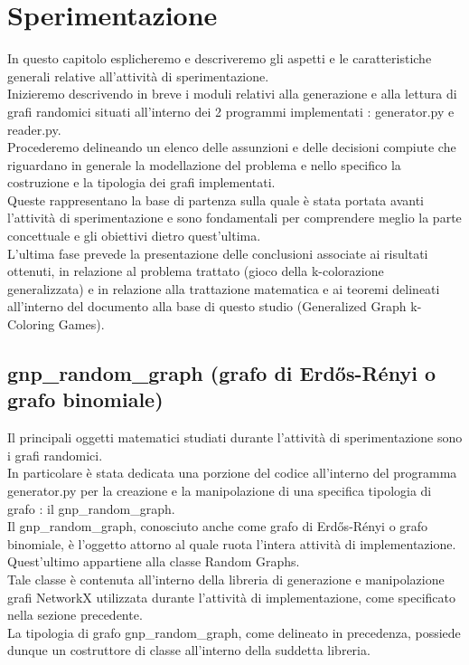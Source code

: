 \chapter{Sperimentazione}
\justify
In questo capitolo esplicheremo e descriveremo gli aspetti e le caratteristiche generali relative all'attività di sperimentazione.\\

Inizieremo descrivendo in breve i moduli relativi alla generazione e alla lettura di grafi randomici situati all'interno dei 2 programmi implementati : generator.py e reader.py.\\

Procederemo delineando un elenco delle assunzioni e delle decisioni compiute che riguardano in generale la modellazione del problema e nello specifico la costruzione e la tipologia dei grafi implementati.\\
Queste rappresentano la base di partenza sulla quale è stata portata avanti l'attività di sperimentazione e sono fondamentali per comprendere meglio la parte concettuale e gli obiettivi dietro quest'ultima.\\

L'ultima fase prevede la presentazione delle conclusioni associate ai risultati ottenuti, in relazione al problema trattato (gioco della k-colorazione generalizzata) e in relazione alla trattazione matematica e ai teoremi delineati all'interno del documento alla base di questo studio (Generalized Graph k-Coloring Games).\\

\section{gnp\_random\_graph (grafo di Erdős-Rényi o grafo binomiale)}
\justify
Il principali oggetti matematici studiati durante l'attività di sperimentazione sono i grafi randomici.\\

In particolare è stata dedicata una porzione del codice all'interno del programma generator.py per la creazione e la manipolazione di una specifica tipologia di grafo : il gnp\_random\_graph.\\

Il gnp\_random\_graph, conosciuto anche come grafo di Erdős-Rényi o grafo binomiale, è l'oggetto attorno al quale ruota l'intera attività di implementazione.\\ Quest'ultimo appartiene alla classe Random Graphs.\\
Tale classe è contenuta all'interno della libreria di generazione e manipolazione grafi NetworkX utilizzata durante l'attività di implementazione, come specificato nella sezione precedente.\\
La tipologia di grafo gnp\_random\_graph, come delineato in precedenza, possiede dunque un costruttore di classe all'interno della suddetta libreria.\\


